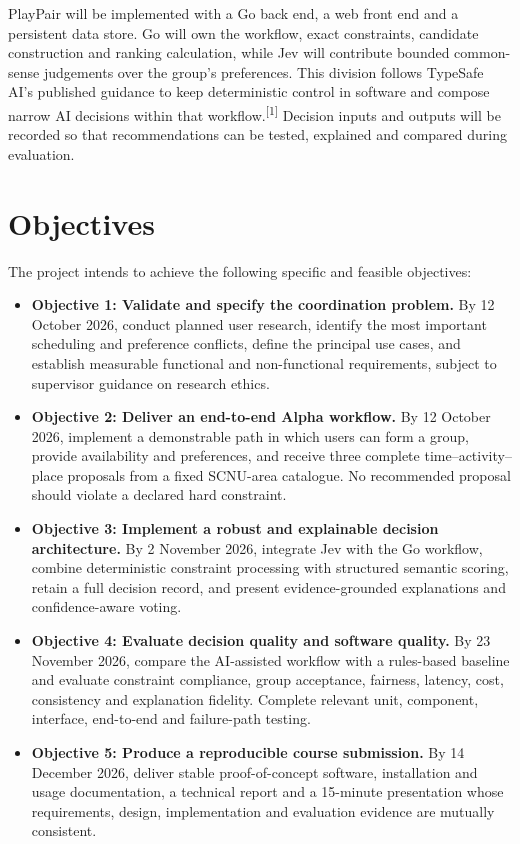 \documentclass[12pt,a4paper]{article}
\newcommand{\objective}[1]{\textbf{Objective #1}}
\newcommand{\sourcecite}[1]{\textsuperscript{[#1]}}
\begin{document}
PlayPair will be implemented with a Go back end, a web front end and a persistent data store. Go will own the workflow, exact constraints, candidate construction and ranking calculation, while Jev will contribute bounded common-sense judgements over the group's preferences. This division follows TypeSafe AI's published guidance to keep deterministic control in software and compose narrow AI decisions within that workflow.\sourcecite{1} Decision inputs and outputs will be recorded so that recommendations can be tested, explained and compared during evaluation.

\section*{Objectives}

The project intends to achieve the following specific and feasible objectives:

\begin{itemize}
  \item \objective{1: Validate and specify the coordination problem.} By 12 October 2026, conduct planned user research, identify the most important scheduling and preference conflicts, define the principal use cases, and establish measurable functional and non-functional requirements, subject to supervisor guidance on research ethics.

  \item \objective{2: Deliver an end-to-end Alpha workflow.} By 12 October 2026, implement a demonstrable path in which users can form a group, provide availability and preferences, and receive three complete time--activity--place proposals from a fixed SCNU-area catalogue. No recommended proposal should violate a declared hard constraint.

  \item \objective{3: Implement a robust and explainable decision architecture.} By 2 November 2026, integrate Jev with the Go workflow, combine deterministic constraint processing with structured semantic scoring, retain a full decision record, and present evidence-grounded explanations and confidence-aware voting.

  \item \objective{4: Evaluate decision quality and software quality.} By 23 November 2026, compare the AI-assisted workflow with a rules-based baseline and evaluate constraint compliance, group acceptance, fairness, latency, cost, consistency and explanation fidelity. Complete relevant unit, component, interface, end-to-end and failure-path testing.

  \item \objective{5: Produce a reproducible course submission.} By 14 December 2026, deliver stable proof-of-concept software, installation and usage documentation, a technical report and a 15-minute presentation whose requirements, design, implementation and evaluation evidence are mutually consistent.
\end{itemize}
\end{document}
